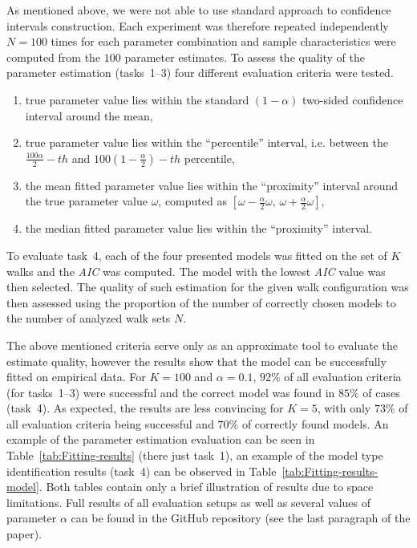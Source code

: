 \documentclass{amsart}
\theoremstyle{definition}
\theoremstyle{plain}
\theoremstyle{plain}
\theoremstyle{plain}
\numberwithin{equation}{section}
\begin{document}
    As mentioned above, we were not able to use standard approach to confidence intervals construction.
    Each experiment was therefore repeated independently $N=100$ times for each parameter combination and sample characteristics were computed from the $100$ parameter estimates.
    To assess the quality of the parameter estimation (tasks~1--3) four different evaluation criteria were tested.
    \begin{enumerate}
        \item true parameter value lies within the standard $(1-\alpha)$ two-sided confidence interval around the mean,
        \item true parameter value lies within the ``percentile'' interval, i.e. between the $\frac{{100}\alpha}{2}-th$ and $100\left(1-\frac{\alpha}{2}\right)-th$ percentile,
        \item the mean fitted parameter value lies within the ``proximity'' interval around the true parameter value $\omega$, computed as $[\omega-\frac{\alpha}{2}\omega,\,\omega+\frac{\alpha}{2}\omega]$,
        \item the median fitted parameter value lies within the ``proximity'' interval.
    \end{enumerate}

    To evaluate task~4, each of the four presented models was fitted on the set of $K$ walks and the \emph{AIC} was computed.
    The model with the lowest \emph{AIC} value was then selected.
    The quality of such estimation for the given walk configuration was then assessed using the proportion of the number of correctly chosen models to the number of analyzed walk sets $N$.

    The above mentioned criteria serve only as an approximate tool to evaluate the estimate quality, however the results show that the model can be successfully fitted on empirical data.
    For $K=100$ and $\alpha=0.1$, $92\%$ of all evaluation criteria (for tasks~1--3) were successful and the correct model was found in $85\%$ of cases (task~4).
    As expected, the results are less convincing for $K=5$, with only $73\%$ of all evaluation criteria being successful and $70\%$ of correctly found models.
    An example of the parameter estimation evaluation can be seen in Table~\ref{tab:Fitting-results} (there just task~1), an example of the model type identification results (task~4) can be observed in Table~\ref{tab:Fitting-results-model}.
    Both tables contain only a brief illustration of results due to space limitations.
    Full results of all evaluation setups as well as several values of parameter $\alpha$ can be found in the GitHub repository (see the last paragraph of the paper).
\end{document}
